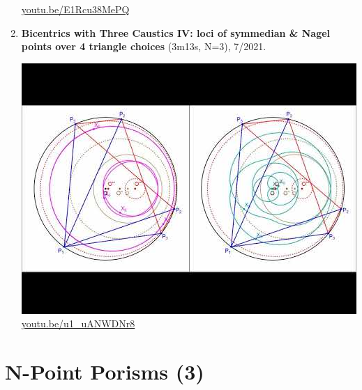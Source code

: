 \documentclass[12pt]{amsart}
\begin{document}
\begin{enumerate}[resume]
\begin{center}
\href{https://youtu.be/E1Rcu38MePQ}{\url{youtu.be/E1Rcu38MePQ}}\end{center}
% 
\item \textbf{Bicentrics with Three Caustics IV: loci of symmedian \& Nagel points over 4 triangle choices} (3m13s, N=3), 7/2021. 
\begin{center}\includegraphics[width=.5\textwidth]{pics/u1_uANWDNr8.jpg} \\ 
\href{https://youtu.be/u1_uANWDNr8}{\url{youtu.be/u1\_uANWDNr8}}\end{center}
% 
\end{enumerate}

\section{N-Point Porisms (3)}
\end{document}
